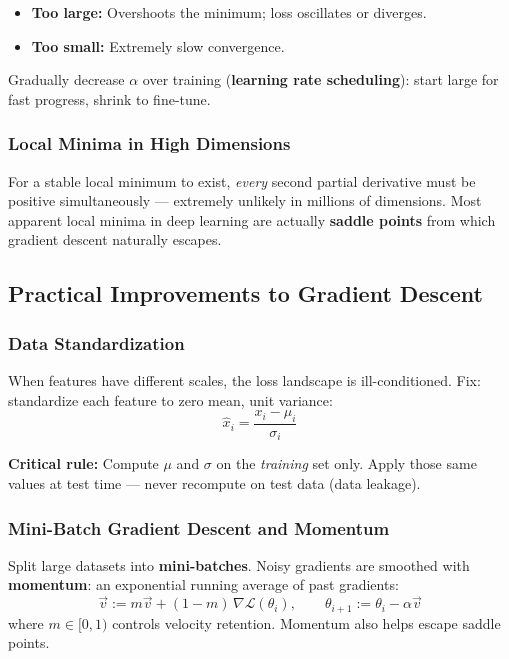 \documentclass[11pt]{article}
\begin{document}
\begin{itemize}
  \item \textbf{Too large:} Overshoots the minimum; loss oscillates or diverges.
  \item \textbf{Too small:} Extremely slow convergence.
\end{itemize}
Gradually decrease $\alpha$ over training (\textbf{learning rate scheduling}): start large for fast progress, shrink to fine-tune.

\subsubsection{Local Minima in High Dimensions}

For a stable local minimum to exist, \emph{every} second partial derivative must be positive simultaneously --- extremely unlikely in millions of dimensions. Most apparent local minima in deep learning are actually \textbf{saddle points} from which gradient descent naturally escapes.

\subsection{Practical Improvements to Gradient Descent}

\subsubsection{Data Standardization}

When features have different scales, the loss landscape is ill-conditioned. Fix: standardize each feature to zero mean, unit variance:
\[
\hat{x}_i = \frac{x_i - \mu_i}{\sigma_i}
\]

\begin{notebox}
\textbf{Critical rule:} Compute $\mu$ and $\sigma$ on the \emph{training} set only. Apply those same values at test time --- never recompute on test data (data leakage).
\end{notebox}

\subsubsection{Mini-Batch Gradient Descent and Momentum}

Split large datasets into \textbf{mini-batches}. Noisy gradients are smoothed with \textbf{momentum}: an exponential running average of past gradients:
\[
\vec{v} := m\vec{v} + (1-m)\,\nabla\mathcal{L}(\theta_i), \qquad \theta_{i+1} := \theta_i - \alpha\vec{v}
\]
where $m \in [0,1)$ controls velocity retention. Momentum also helps escape saddle points.
\end{document}
